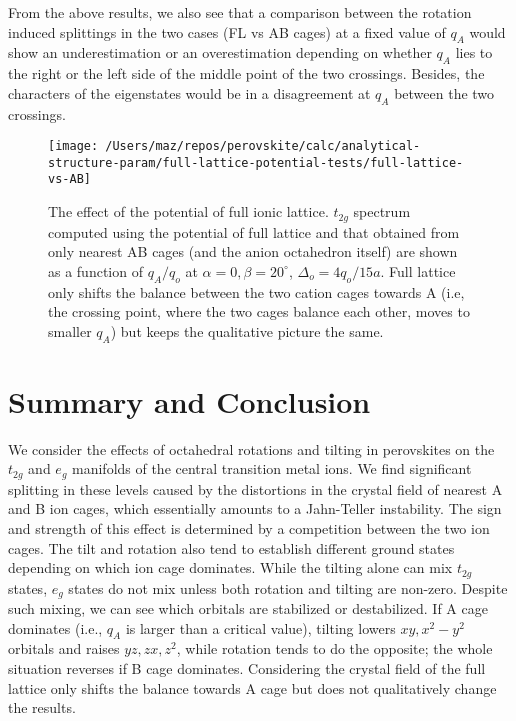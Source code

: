 \documentclass[a4paper,prb,twocolumn]{revtex4-1}  %
\newcommand{\com}[1]{}
\begin{document}
From the above results, we also see that
a comparison between the rotation induced splittings
 in the two
cases (FL vs AB cages)
at a fixed value of $q_A$
would show an underestimation or an overestimation 
depending on whether $q_A$ lies to the right or the left side of the 
middle point of the two crossings.
Besides, the characters of the eigenstates
would be in a disagreement at $q_A$
between the two crossings.




\com{
Since the qualitative picture stays the same
in FL case,
we can 
think of the effect of the rest of the ions in the lattice
still in terms of the AB cages by renormalising $q_A$.
}




\begin{figure}[htbp]
\begin{center}
\texttt{[image: /Users/maz/repos/perovskite/calc/analytical-structure-param/full-lattice-potential-tests/full-lattice-vs-AB]}
\caption{
The effect of the potential of full ionic lattice.
$t_{2g}$ spectrum computed using the potential of full lattice 
and that obtained from only nearest AB cages (and the anion octahedron itself)
are
shown as a function of $q_A/q_o$ at 
$\alpha=0,\beta=20^\circ$, $\Delta_o=4q_o/15a$.
Full lattice only shifts the balance between the two cation cages towards A 
(i.e, the crossing point, where the two cages balance each other, moves to smaller $q_A$)
but keeps the qualitative picture the same.
}
\label{fig:t2g-lattice}
\end{center}
\end{figure}





\section{Summary and Conclusion}


We consider the effects of octahedral rotations and tilting in perovskites
on the $t_{2g}$ and $e_g$ manifolds of the central transition metal ions.
We find significant splitting in these levels
caused by the distortions in the crystal field of nearest A and B ion cages,
which
essentially amounts to a 
Jahn-Teller instability.
The sign and strength of this effect is 
determined by
a competition between the two ion cages.
The tilt 
and rotation 
also tend to establish different ground states
depending
on which ion cage dominates.
While the tilting alone can mix $t_{2g}$ states,
$e_g$ states
do not mix unless both rotation and tilting are non-zero.
Despite such mixing, we can see which orbitals are stabilized or destabilized.
If A cage dominates (i.e., $q_A$ is larger than a critical value),
tilting lowers
$xy,x^2-y^2$ orbitals
and raises $yz,zx,z^2$,
while 
rotation tends to do the opposite;
the whole situation reverses if B cage dominates.
Considering the crystal field of the full lattice 
only shifts the balance towards A cage
but does not qualitatively change the results.
\end{document}

